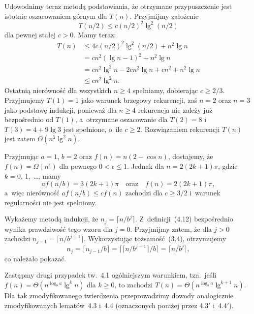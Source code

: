 Udowodnimy teraz metodą podstawiania, że otrzymane przypuszczenie jest istotnie oszacowaniem górnym dla $T(n)$. Przyjmijmy założenie
\[
	T(n/2) \le c(n/2)^2\lg^2(n/2)
\]
dla pewnej stałej $c>0$. Mamy teraz:
\begin{align*}
	T(n) &\le 4c(n/2)^2\lg^2(n/2)+n^2\lg n \\
	&= cn^2(\lg n-1)^2+n^2\lg n \\
	&= cn^2\lg^2n-2cn^2\lg n+cn^2+n^2\lg n \\
	&\le cn^2\lg^2n.
\end{align*}
Ostatnią nierówność dla wszystkich $n\ge4$ spełniamy, dobierając $c\ge2/3$. Przyjmujemy $T(1)=1$ jako warunek brzegowy rekurencji, zaś $n=2$ oraz $n=3$ jako podstawę indukcji, ponieważ dla $n\ge4$ rekurencja nie zależy już bezpośrednio od $T(1)$, a~otrzymane oszacowanie dla $T(2)=8$ i~$T(3)=4+9\lg3$ jest spełnione, o~ile $c\ge2$. Rozwiązaniem rekurencji $T(n)$ jest zatem $O(n^2\lg^2n)$.

\exercise %
Przyjmując $a=1$, $b=2$ oraz $f(n)=n(2-\cos n)$, dostajemy, że $f(n)=\Omega(n^\epsilon)$ dla pewnego $0<\epsilon\le1$. Jednak dla $n=2(2k+1)\pi$, gdzie $k=0$, 1,~\dots, mamy
\[
	af(n/b) = 3(2k+1)\pi \quad\text{oraz}\quad f(n) = 2(2k+1)\pi,
\]
a~więc nierówność $af(n/b)\le cf(n)$ zachodzi dla $c\ge3/2$ i~warunek regularności nie jest spełniony.


\exercise %
Wykażemy metodą indukcji, że $n_j=\bigl\lceil n/b^j\bigr\rceil$. Z~definicji~(4.12) bezpośrednio wynika prawdziwość tego wzoru dla $j=0$. Przyjmijmy zatem, że dla $j>0$ zachodzi $n_{j-1}=\bigl\lceil n/b^{j-1}\bigr\rceil$. Wykorzystując tożsamość~(3.4), otrzymujemy
\[
	n_j = \lceil n_{j-1}/b\rceil = \bigl\lceil\bigl\lceil n/b^{j-1}\bigr\rceil/b\bigr\rceil = \bigl\lceil n/b^j\bigr\rceil,
\]
co należało pokazać.

\exercise %
Zastąpmy drugi przypadek tw.~4.1 ogólniejszym warunkiem, tzn.\ jeśli $f(n)=\Theta(n^{\log_ba}\lg^kn)$ dla $k\ge0$, to zachodzi $T(n)=\Theta(n^{\log_ba}\lg^{k+1}n)$. Dla tak zmodyfikowanego twierdzenia przeprowadzimy dowody analogicznie zmodyfikowanych lematów~4.3 i~4.4 (oznaczonych poniżej przez 4.3$'$ i~4.4$'$).

